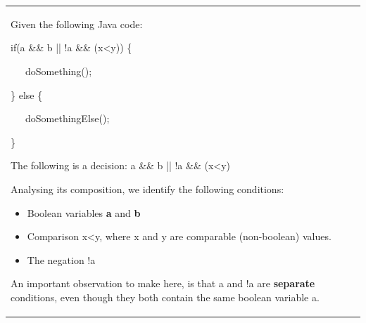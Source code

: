 \documentclass{article}
\newcommand{\tmtextbf}[1]{{\bfseries{#1}}}
\newenvironment{itemizedot}{\begin{itemize} \renewcommand{\labelitemi}{$\bullet$}\renewcommand{\labelitemii}{$\bullet$}\renewcommand{\labelitemiii}{$\bullet$}\renewcommand{\labelitemiv}{$\bullet$}}{\end{itemize}}
\newenvironment{itemizeminus}{\begin{itemize} \renewcommand{\labelitemi}{$-$}\renewcommand{\labelitemii}{$-$}\renewcommand{\labelitemiii}{$-$}\renewcommand{\labelitemiv}{$-$}}{\end{itemize}}
\newenvironment{tmindent}{\begin{tmparmod}{1.5em}{0pt}{0pt} }{\end{tmparmod}}
\newenvironment{tmparmod}[3]{\begin{list}{}{\setlength{\topsep}{0pt}\setlength{\leftmargin}{#1}\setlength{\rightmargin}{#2}\setlength{\parindent}{#3}\setlength{\listparindent}{\parindent}\setlength{\itemindent}{\parindent}\setlength{\parsep}{\parskip}} \item[]}{\end{list}}
\newenvironment{tmparsep}[1]{\begingroup\setlength{\parskip}{#1}}{\endgroup}
\begin{document}
\begin{tmparmod}{1cm}{0pt}{0pt}
  \begin{tmparmod}{0pt}{1cm}{0pt}
    {\noindent}{\noindent}\begin{tabular}{l}
      \begin{example}
        
        
        
        
        Given the following Java code: \
        
        {\noindent}\begin{tmindent}
          \begin{tmparsep}{0em}
            if(a \&\& b || !a \&\& (x<y)) \{
            
            \ \ \ doSomething();
            
            \} else \{
            
            \ \ \ doSomethingElse();
            
            \}
          \end{tmparsep}
        \end{tmindent}{\hspace*{\fill}}{\medskip}
        
        The following is a decision: a \&\& b || !a \&\& (x<y)
        
        
        
        Analysing its composition, we identify the following conditions:
        \begin{itemizeminus}
          \begin{itemizedot}
            \item Boolean variables \tmtextbf{a} and \tmtextbf{b}
            
            \item Comparison x<y, where x and y are comparable (non-boolean)
            values.
            
            \item The negation !a
          \end{itemizedot}
        \end{itemizeminus}
        
        
        An important observation to make here, is that a and !a are
        \tmtextbf{separate} conditions, even though they both contain the same
        boolean variable a.
      \end{example}
    \end{tabular}{\hspace*{\fill}}{\smallskip}
  \end{tmparmod}
\end{tmparmod}
\end{document}
